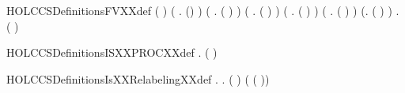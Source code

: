 \begin{SaveVerbatim}{HOLCCSDefinitionsFVXXdef}
\HOLTokenTurnstile{} (  \HOLSymConst{=} \HOLTokenLeftbrace{}\HOLTokenRightbrace{}) \HOLSymConst{\HOLTokenConj{}} (\HOLSymConst{\HOLTokenForall{}} .  () \HOLSymConst{=}  ) \HOLSymConst{\HOLTokenConj{}}
   (\HOLSymConst{\HOLTokenForall{}} .  ( \HOLSymConst{\ensuremath{+}} ) \HOLSymConst{=}   \HOLConst{\HOLTokenUnion{}}  ) \HOLSymConst{\HOLTokenConj{}}
   (\HOLSymConst{\HOLTokenForall{}} .  ( \HOLSymConst{\ensuremath{\parallel}} ) \HOLSymConst{=}   \HOLConst{\HOLTokenUnion{}}  ) \HOLSymConst{\HOLTokenConj{}}
   (\HOLSymConst{\HOLTokenForall{}} .  (\HOLConst{\ensuremath{\nu}}  ) \HOLSymConst{=}  ) \HOLSymConst{\HOLTokenConj{}} (\HOLSymConst{\HOLTokenForall{}} .  (  ) \HOLSymConst{=}  ) \HOLSymConst{\HOLTokenConj{}}
   (\HOLSymConst{\HOLTokenForall{}}.  ( ) \HOLSymConst{=} \HOLTokenLeftbrace{}\HOLTokenRightbrace{}) \HOLSymConst{\HOLTokenConj{}} \HOLSymConst{\HOLTokenForall{}} .  (  ) \HOLSymConst{=}    
\end{SaveVerbatim}
\newcommand{\HOLCCSDefinitionsFVXXdef}{\UseVerbatim{HOLCCSDefinitionsFVXXdef}}
\begin{SaveVerbatim}{HOLCCSDefinitionsISXXPROCXXdef}
\HOLTokenTurnstile{} \HOLSymConst{\HOLTokenForall{}}.   \HOLSymConst{\HOLTokenEquiv{}} (  \HOLSymConst{=} \HOLTokenLeftbrace{}\HOLTokenRightbrace{})
\end{SaveVerbatim}
\newcommand{\HOLCCSDefinitionsISXXPROCXXdef}{\UseVerbatim{HOLCCSDefinitionsISXXPROCXXdef}}
\begin{SaveVerbatim}{HOLCCSDefinitionsIsXXRelabelingXXdef}
\HOLTokenTurnstile{} \HOLSymConst{\HOLTokenForall{}}.   \HOLSymConst{\HOLTokenEquiv{}} \HOLSymConst{\HOLTokenForall{}}.  ( ) \HOLSymConst{=}  ( ( ))
\end{SaveVerbatim}
